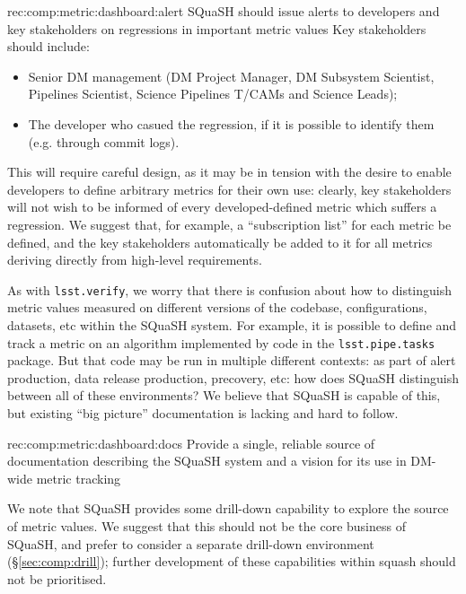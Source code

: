 \begin{recommendation}
    {rec:comp:metric:dashboard:alert}
    {SQuaSH should issue alerts to developers and key stakeholders on regressions in important metric values}
    Key stakeholders should include:
    \begin{itemize}
      \item{Senior DM management (DM Project Manager, DM Subsystem Scientist, Pipelines Scientist, Science Pipelines T/CAMs and Science Leads);}
      \item{The developer who casued the regression, if it is possible to identify them (e.g. through commit logs).}
    \end{itemize}
    This will require careful design, as it may be in tension with the desire to enable developers to define arbitrary metrics for their own use: clearly, key stakeholders will not wish to be informed of every developed-defined metric which suffers a regression.
    We suggest that, for example, a ``subscription list'' for each metric be defined, and the key stakeholders automatically be added to it for all metrics deriving directly from high-level requirements.
\end{recommendation}

As with \texttt{lsst.verify}, we worry that there is confusion about how to distinguish metric values measured on different versions of the codebase, configurations, datasets, etc within the SQuaSH system.
For example, it is possible to define and track a metric on an algorithm implemented by code in the \texttt{lsst.pipe.tasks} package.
But that code may be run in multiple different contexts: as part of alert production, data release production, precovery, etc: how does SQuaSH distinguish between all of these environments?
We believe that SQuaSH is capable of this, but existing ``big picture'' documentation is lacking and hard to follow.

\begin{recommendation}
  {rec:comp:metric:dashboard:docs}
  {Provide a single, reliable source of documentation describing the SQuaSH system and a vision for its use in DM-wide metric tracking}
\end{recommendation}

We note that SQuaSH provides some drill-down capability to explore the source of metric values.
We suggest that this should not be the core business of SQuaSH, and prefer to consider a separate drill-down environment (\S\ref{sec:comp:drill}); further development of these capabilities within squash should not be prioritised.

